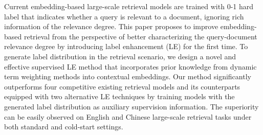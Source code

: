 Current embedding-based large-scale retrieval models are trained with 0-1 hard label that indicates whether a query is relevant to a document, ignoring rich information of the relevance degree. This paper proposes to improve embedding-based retrieval from the perspective of better characterizing the query-document relevance degree by introducing label enhancement (LE) for the first time. To generate label distribution in the retrieval scenario, we design a novel and effective supervised LE method that incorporates prior knowledge from dynamic term weighting methods into contextual embeddings.  Our method significantly outperforms four competitive existing retrieval models and its counterparts equipped with two alternative LE techniques by training models with the generated label distribution as auxiliary supervision information. The superiority can be easily observed on English and Chinese large-scale retrieval tasks under both standard and cold-start settings.
